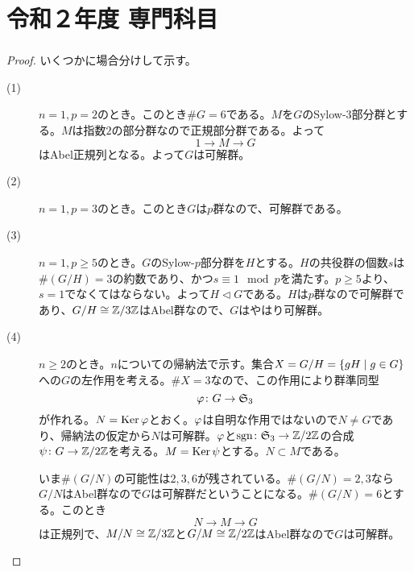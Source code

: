 \section{令和２年度 専門科目}

\subsubsection{}%
\begin{proof}
  いくつかに場合分けして示す。
  \begin{description}
    \item[(1)] $n=1, p=2$のとき。このとき$\# G=6$である。$M$を$G$のSylow-$3$部分群とする。$M$は指数$2$の部分群なので正規部分群である。よって
    \[
    1 \to M \to G
    \]
    はAbel正規列となる。よって$G$は可解群。
    \item[(2)] $n=1,p =3$のとき。このとき$G$は$p$群なので、可解群である。
    \item[(3)] $n=1, p \geq 5$のとき。$G$のSylow-$p$部分群を$H$とする。$H$の共役群の個数$s$は$\# (G/H) = 3$の約数であり、かつ$s \equiv 1 \mod p$を満たす。$p \geq 5$より、$s = 1$でなくてはならない。よって$H \lhd G$である。$H$は$p$群なので可解群であり、$G/H \cong \mathbb{Z} / 3 \mathbb{Z}$はAbel群なので、$G$はやはり可解群。
    \item[(4)] $n \geq 2$のとき。$n$についての帰納法で示す。集合$X = G/H = \left\{ gH  \mathrel{} \middle| \mathrel{} g \in G \right\}$への$G$の左作用を考える。$\# X = 3$なので、この作用により群準同型
    \[
    {\varphi} \colon G \to \mathfrak{S}_3
    \]
    が作れる。$N = \operatorname{Ker} {\varphi}$とおく。${\varphi}$は自明な作用ではないので$N \neq G$であり、帰納法の仮定から$N$は可解群。${\varphi}$と$\operatorname{sgn} \colon \mathfrak{S}_3 \to \mathbb{Z} / 2 \mathbb{Z}$の合成$\psi \colon G \to \mathbb{Z} / 2 \mathbb{Z}$を考える。$M = \operatorname{Ker} \psi$とする。$N \subset M$である。

    いま$\#(G/N)$の可能性は$2,3,6$が残されている。$\# (G/N) = 2,3$なら$G/N$はAbel群なので$G$は可解群だということになる。$\# (G/N) = 6$とする。このとき
    \[
    N \to M \to G
    \]
    は正規列で、$M/N \cong \mathbb{Z} / 3 \mathbb{Z}$と$G/M \cong \mathbb{Z} / 2 \mathbb{Z}$はAbel群なので$G$は可解群。
  \end{description}
\end{proof}

\newpage


